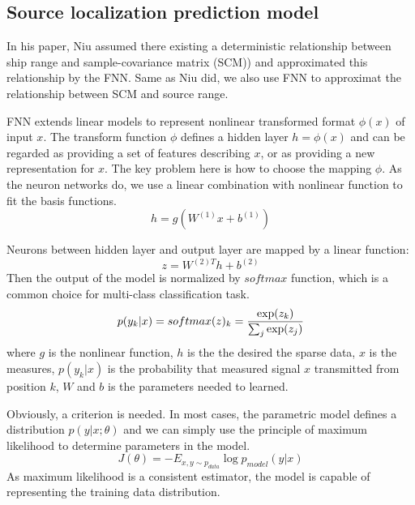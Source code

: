 \subsection{Source localization prediction model}
In his paper, Niu assumed there existing a deterministic relationship between ship range and sample-covariance matrix (SCM)) and approximated this relationship by the FNN. Same as Niu did, we also use FNN to approximat the relationship between
SCM and source range.

FNN extends linear models to represent nonlinear transformed format $\phi(x)$ of input $x$. The transform function $\phi$ defines a hidden layer $h=\phi(x)$ and can be regarded as providing a set of features describing $x$, or as providing a new representation for $x$. The key problem here is how to choose the mapping $\phi$. As the neuron networks do, we use a linear combination with nonlinear function to fit the basis functions.
\begin{equation}
h = g(W^{(1)}x + b^{(1)})
\end{equation}

Neurons between hidden layer and output layer are mapped by a linear function:
\begin{equation}
z = {W^{(2)T}}h + {b^{(2)}}
\end{equation}
Then the output of the model is normalized by $softmax$ function, which is a common choice for multi-class classification task.\cite{bishop2006pattern}
\begin{equation}
p({y_k}|x) = softmax {(z)_k} = {{\exp ({z_k})} \over {\sum\nolimits_j {\exp ({z_j})} }}
\end{equation}
where $g$ is the nonlinear function, $h$ is the the desired the sparse data, $x$ is the measures, $p({y_k}|x)$ is the probability that measured signal $x$ transmitted from position $k$, $W$ and $b$ is the parameters needed to learned.

Obviously, a criterion is needed. In most cases, the parametric model defines a distribution $p(y|x;\theta)$ and we can simply use the principle of maximum likelihood to determine parameters in the model.
\begin{equation}
J(\theta ) =  - {E_{x,y \sim {p_{data}}}}\log {p_{model}}(y|x)
\end{equation}
As maximum likelihood is a consistent estimator, the model is capable of representing the training data distribution.

